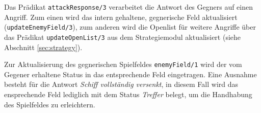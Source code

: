 	Das Prädikat \texttt{attackResponse/3} verarbeitet die Antwort des Gegners auf einen Angriff. Zum einen wird das intern gehaltene, 
	gegnerische Feld aktualisiert (\texttt{updateEnemyField/3}), zum anderen wird die Openlist für weitere Angriffe über 
	das Prädikat \texttt{updateOpenList/3} aus dem Strategiemodul aktualisiert (siehe Abschnitt \ref{sec:strategy}).
	
	Zur Aktualisierung des gegnerischen Spielfeldes \texttt{enemyField/1} wird der vom Gegener erhaltene Status in das entsprechende 
	Feld eingetragen. Eine Ausnahme besteht für die Antwort \textit{Schiff vollständig versenkt}, in diesem Fall wird das ensprechende
	Feld lediglich mit dem Status \textit{Treffer} belegt, um die Handhabung des Spielfeldes zu erleichtern. 

	

	
	
	
	

